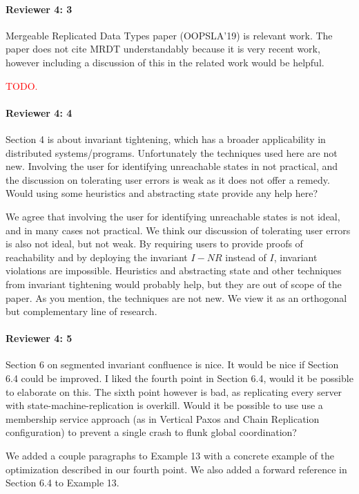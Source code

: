 \documentclass[9pt]{article}
\begin{document}
\begin{multicols*}{2}
\paragraph{Reviewer 4: 3}
\begin{feedback}
  Mergeable Replicated Data Types paper (OOPSLA'19) is relevant work. The paper
  does not cite MRDT understandably because it is very recent work, however
  including a discussion of this in the related work would be helpful.
\end{feedback}
\textcolor{red}{TODO.}

\paragraph{Reviewer 4: 4}
\begin{feedback}
  Section 4 is about invariant tightening, which has a broader applicability in
  distributed systems/programs. Unfortunately the techniques used here are not
  new. Involving the user for identifying unreachable states in not practical,
  and the discussion on tolerating user errors is weak as it does not offer a
  remedy. Would using some heuristics and abstracting state provide any help
  here?
\end{feedback}
We agree that involving the user for identifying unreachable states is not
ideal, and in many cases not practical. We think our discussion of tolerating
user errors is also not ideal, but not weak. By requiring users to provide
proofs of reachability and by deploying the invariant $I - NR$ instead of $I$,
invariant violations are impossible.
%
Heuristics and abstracting state and other techniques from invariant tightening
would probably help, but they are out of scope of the paper. As you mention,
the techniques are not new. We view it as an orthogonal but complementary line
of research.

\paragraph{Reviewer 4: 5}
\begin{feedback}
  Section 6 on segmented invariant confluence is nice. It would be nice if
  Section 6.4 could be improved. I liked the fourth point in Section 6.4, would
  it be possible to elaborate on this. The sixth point however is bad, as
  replicating every server with state-machine-replication is overkill. Would it
  be possible to use use a membership service approach (as in Vertical Paxos
  and Chain Replication configuration) to prevent a single crash to flunk
  global coordination?
\end{feedback}
We added a couple paragraphs to Example 13 with a concrete example of the
optimization described in our fourth point. We also added a forward reference
in Section 6.4 to Example 13.


\end{multicols*}
\end{document}
